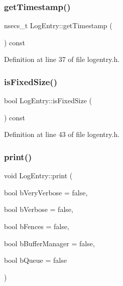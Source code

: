 \subsubsection{\texorpdfstring{get\+Timestamp()}{getTimestamp()}}
{\footnotesize\ttfamily nsecs\+\_\+t Log\+Entry\+::get\+Timestamp (\begin{DoxyParamCaption}{ }\end{DoxyParamCaption}) const\hspace{0.3cm}{\ttfamily [inline]}}



Definition at line 37 of file logentry.\+h.


\begin{DoxyCode}{0}
\end{DoxyCode}
\mbox{\label{classLogEntry_a5711231fdc0709752e67aa82fad051e1}} 
\subsubsection{\texorpdfstring{is\+Fixed\+Size()}{isFixedSize()}}
{\footnotesize\ttfamily bool Log\+Entry\+::is\+Fixed\+Size (\begin{DoxyParamCaption}{ }\end{DoxyParamCaption}) const\hspace{0.3cm}{\ttfamily [inline]}}



Definition at line 43 of file logentry.\+h.


\begin{DoxyCode}{0}
\end{DoxyCode}
\mbox{\label{classLogEntry_a15620abfed3ae9b39e565de00b50cf00}} 
\subsubsection{\texorpdfstring{print()}{print()}}
{\footnotesize\ttfamily void Log\+Entry\+::print (\begin{DoxyParamCaption}\item[{bool}]{b\+Very\+Verbose = {\ttfamily false},  }\item[{bool}]{b\+Verbose = {\ttfamily false},  }\item[{bool}]{b\+Fences = {\ttfamily false},  }\item[{bool}]{b\+Buffer\+Manager = {\ttfamily false},  }\item[{bool}]{b\+Queue = {\ttfamily false} }\end{DoxyParamCaption})}




